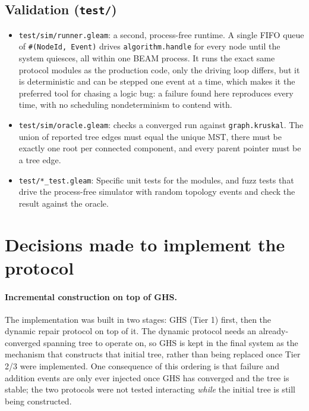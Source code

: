 \subsection{Validation (\texttt{test/})}

\begin{itemize}
  \item \texttt{test/sim/runner.gleam}: a second, process-free runtime. A single FIFO
  queue of \texttt{\#(NodeId, Event)} drives \texttt{algorithm.handle} for every node
  until the system quiesces, all within one BEAM process. It runs the exact same protocol
  modules as the production code, only the driving loop differs, but it is deterministic
  and can be stepped one event at a time, which makes it the preferred tool for chasing a
  logic bug: a failure found here reproduces every time, with no scheduling
  nondeterminism to contend with.
  \item \texttt{test/sim/oracle.gleam}: checks a converged run against
  \texttt{graph.kruskal}. The union of reported tree edges must equal the unique MST,
  there must be exactly one root per connected component, and every parent pointer must be
  a tree edge.
  \item \texttt{test/*\_test.gleam}: Specific unit tests for the modules, and fuzz tests that drive the process-free simulator with random topology events and check the result against the oracle.
\end{itemize}

\section{Decisions made to implement the protocol}

\paragraph{Incremental construction on top of GHS.}
The implementation was built in two stages: GHS (Tier 1) first, then the dynamic
repair protocol on top of it. The dynamic protocol
needs an already-converged spanning tree to operate on, so GHS is kept in the final
system as the mechanism that constructs that initial tree, rather than being replaced
once Tier 2/3 were implemented. One consequence of this ordering is that failure and
addition events are only ever injected once GHS has converged and the tree is stable;
the two protocols were not tested interacting \emph{while} the initial tree is still
being constructed.

